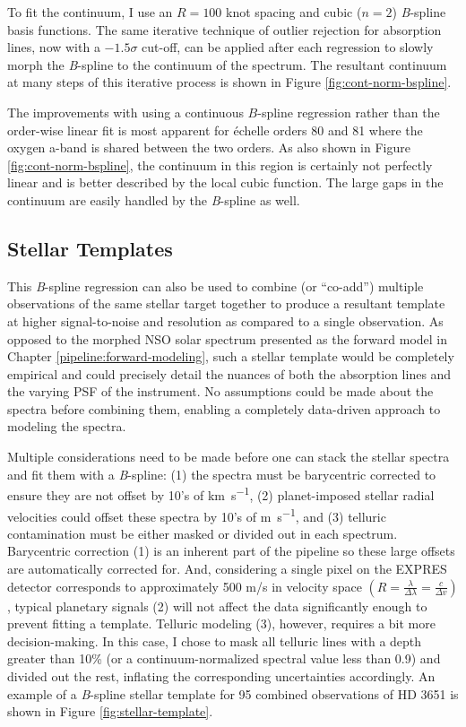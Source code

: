 To fit the continuum, I use an $R=100$ knot spacing and cubic ($n=2$) \textit{B}-spline basis functions. The same iterative technique of outlier rejection for absorption lines, now with a $-1.5\sigma$ cut-off, can be applied after each regression to slowly morph the \textit{B}-spline to the continuum of the spectrum. The resultant continuum at many steps of this iterative process is shown in Figure \ref{fig:cont-norm-bspline}.

The improvements with using a continuous $B$-spline regression rather than the order-wise linear fit is most apparent for \'echelle orders 80 and 81 where the oxygen a-band is shared between the two orders. As also shown in Figure \ref{fig:cont-norm-bspline}, the continuum in this region is certainly not perfectly linear and is better described by the local cubic function. The large gaps in the continuum are easily handled by the \textit{B}-spline as well.

\subsection{Stellar Templates} \label{pipeline2:bspline:templates}

This \textit{B}-spline regression can also be used to combine (or ``co-add'') multiple observations of the same stellar target together to produce a resultant template at higher signal-to-noise and resolution as compared to a single observation. As opposed to the morphed NSO solar spectrum presented as the forward model in Chapter \ref{pipeline:forward-modeling}, such a stellar template would be completely empirical and could precisely detail the nuances of both the absorption lines and the varying PSF of the instrument. No assumptions could be made about the spectra before combining them, enabling a completely data-driven approach to modeling the spectra.

Multiple considerations need to be made before one can stack the stellar spectra and fit them with a \textit{B}-spline: (1) the spectra must be barycentric corrected to ensure they are not offset by 10's of \si{\kilo\meter\per\second}, (2) planet-imposed stellar radial velocities could offset these spectra by 10's of \si{\meter\per\second}, and (3) telluric contamination must be either masked or divided out in each spectrum. Barycentric correction (1) is an inherent part of the pipeline so these large offsets are automatically corrected for. And, considering a single pixel on the EXPRES detector corresponds to approximately 500 m/s in velocity space $\left( R = \frac{\lambda}{\Delta\lambda} = \frac{c}{\Delta v} \right)$, typical planetary signals (2) will not affect the data significantly enough to prevent fitting a template. Telluric modeling (3), however, requires a bit more decision-making. In this case, I chose to mask all telluric lines with a depth greater than 10\% (or a continuum-normalized spectral value less than 0.9) and divided out the rest, inflating the corresponding uncertainties accordingly. An example of a \textit{B}-spline stellar template for 95 combined observations of HD 3651 is shown in Figure \ref{fig:stellar-template}. 

